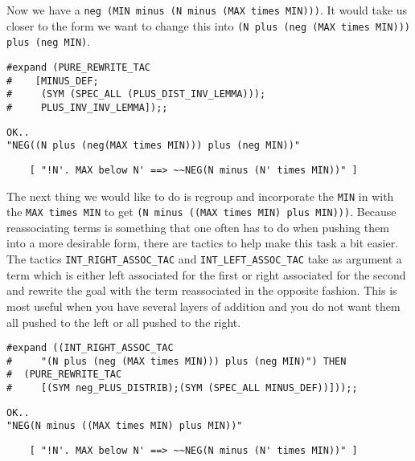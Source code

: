 Now we have a {\small\verb+neg (MIN minus (N minus (MAX times MIN)))+}.  It
would take us closer to the form we want to change this into
{\small\verb+(N plus (neg (MAX times MIN))) plus (neg MIN)+}.  
\begin{session}
\begin{verbatim}
#expand (PURE_REWRITE_TAC
#    [MINUS_DEF;
#     (SYM (SPEC_ALL (PLUS_DIST_INV_LEMMA)));
#     PLUS_INV_INV_LEMMA]);;
\end{verbatim}
\mvdots
\begin{verbatim}
OK..
"NEG((N plus (neg(MAX times MIN))) plus (neg MIN))"
\end{verbatim}
\mvdots
\begin{verbatim}
    [ "!N'. MAX below N' ==> ~~NEG(N minus (N' times MIN))" ]
\end{verbatim}
\evdots
\end{session}

The next thing we would like to do is regroup and incorporate the
{\small\verb+MIN+} in with the {\small\verb+MAX times MIN+} to get
{\small\verb+(N minus ((MAX times MIN) plus MIN)))+}.  Because
reassociating terms is something that one often has to do when pushing
them into a more desirable form, there are tactics to help make this
task a bit easier.  The tactics {\small\verb+INT_RIGHT_ASSOC_TAC+} and
{\small\verb+INT_LEFT_ASSOC_TAC+} take as argument a term which is either
left associated for the first or right associated for the second and
rewrite the goal with the term reassociated in the opposite fashion.
This is most useful when you have several layers of addition and you
do not want them all pushed to the left or all pushed to the right.
\begin{session}
\begin{verbatim}
#expand ((INT_RIGHT_ASSOC_TAC
#     "(N plus (neg (MAX times MIN))) plus (neg MIN)") THEN
#  (PURE_REWRITE_TAC
#     [(SYM neg_PLUS_DISTRIB);(SYM (SPEC_ALL MINUS_DEF))]));;
\end{verbatim}
\mvdots
\begin{verbatim}
OK..
"NEG(N minus ((MAX times MIN) plus MIN))"
\end{verbatim}
\mvdots
\begin{verbatim}
    [ "!N'. MAX below N' ==> ~~NEG(N minus (N' times MIN))" ]
\end{verbatim}
\evdots
\end{session}

